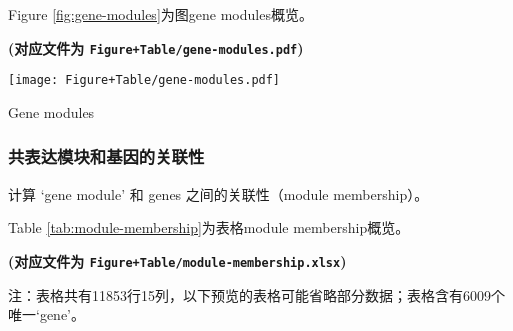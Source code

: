 \documentclass[
]{article}
\begin{document}
Figure \ref{fig:gene-modules}为图gene modules概览。

\textbf{(对应文件为 \texttt{Figure+Table/gene-modules.pdf})}

\def\@captype{figure}
\begin{center}
\texttt{[image: Figure+Table/gene-modules.pdf]}
\caption{Gene modules}\label{fig:gene-modules}
\end{center}

\hypertarget{ux5171ux8868ux8fbeux6a21ux5757ux548cux57faux56e0ux7684ux5173ux8054ux6027}{%
\subsubsection{共表达模块和基因的关联性}\label{ux5171ux8868ux8fbeux6a21ux5757ux548cux57faux56e0ux7684ux5173ux8054ux6027}}

计算 `gene module' 和 genes 之间的关联性（module membership）。

Table \ref{tab:module-membership}为表格module membership概览。

\textbf{(对应文件为 \texttt{Figure+Table/module-membership.xlsx})}

\begin{center}\begin{tcolorbox}[colback=gray!10, colframe=gray!50, width=0.9\linewidth, arc=1mm, boxrule=0.5pt]注：表格共有11853行15列，以下预览的表格可能省略部分数据；表格含有6009个唯一`gene'。
\end{tcolorbox}
\end{center}
\end{document}
